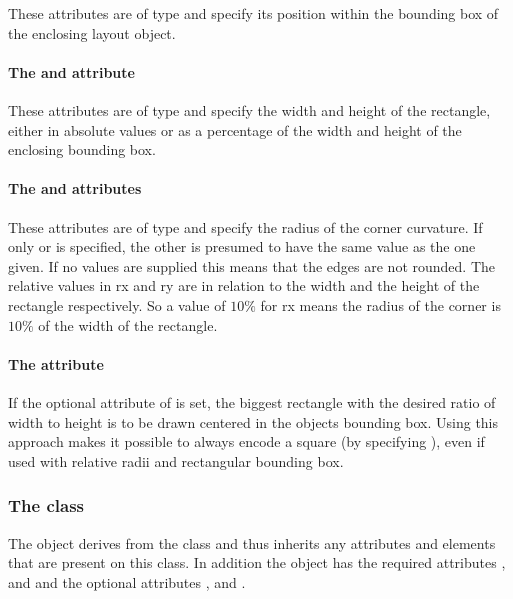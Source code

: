 These attributes are of type
\RelAbsVector and specify its position within the 
bounding box of the enclosing layout object.

\paragraph{The \fixttspace{} and \fixttspace{} attribute}

These attributes are of type
\RelAbsVector and specify the width and height of the rectangle, 
either in absolute values or as a percentage of the width and height of the 
enclosing bounding box. 

\paragraph{The \fixttspace{} and \fixttspace{} attributes}

These attributes are of type
\RelAbsVector and specify the radius of the corner curvature. If only 
or  is specified, the other is presumed to have the same value as the 
one given. If no values are supplied this means that the edges are not rounded.
The relative values in rx and ry are in relation to the width and the height of
 the rectangle respectively. So a value of $10\%$ for rx means the radius of 
the corner is $10\%$ of the width of the rectangle. 


\paragraph{The \fixttspace{} attribute}
If the optional  attribute of  is set, the biggest 
rectangle with the desired ratio of width to height is to be drawn centered in the 
objects bounding box. Using this approach makes it possible to always encode a 
square (by specifying ), even if used with relative radii and 
rectangular bounding box. 


\subsubsection{The  class}
\label{renderellipse-class}


The \RenderEllipse object derives from the \GraphicalPrimitiveTwoD class
and thus inherits any attributes and elements that are present on this
class.
In addition the \RenderEllipse object has the required attributes , 
 and  and the optional attributes ,  and .

